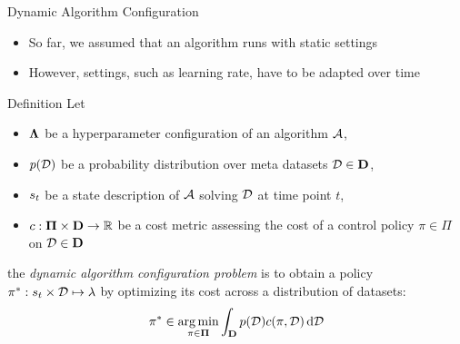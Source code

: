 \begin{frame}[c]{Dynamic Algorithm Configuration}

\begin{itemize}
	\item So far, we assumed that an algorithm runs with static settings
	\item However, settings, such as learning rate, have to be adapted over time
\end{itemize}

\begin{block}{Definition}
	Let 
	\begin{itemize}
		\item $\mathbf{\Lambda}$ be a hyperparameter configuration of an algorithm $\mathcal{A}$,
		\pause
		\item $p(\mathcal{D})$ be a probability distribution over meta datasets $\mathcal{D} \in \mathbf{D}$,
		\pause
		\item $s_t$ be a state description of $\mathcal{A}$ solving $\mathcal{D}$ at time point $t$,
		\pause
		\item $c: \mathbf{\Pi} \times \mathbf{D} \to \mathbb{R}$ be a cost metric assessing the cost of a control policy $\pi \in \Pi$ on $\mathcal{D} \in \mathbf{D}$
	\end{itemize}
	
	\pause
	the \emph{dynamic algorithm configuration problem} is to obtain a policy $\pi^* : s_t \times \mathcal{D} \mapsto \mathbf{\lambda}$ by optimizing its cost across a distribution of datasets:
	\begin{equation}
	\pi^* \in \operatorname*{arg\,min}_{\pi \in \mathbf{\Pi}} \int_{\mathbf{D}} p(\mathcal{D}) c(\pi, \mathcal{D}) \mathop{}\!\mathrm{d} \mathcal{D} \nonumber
	\end{equation}
\end{block}

\end{frame}

